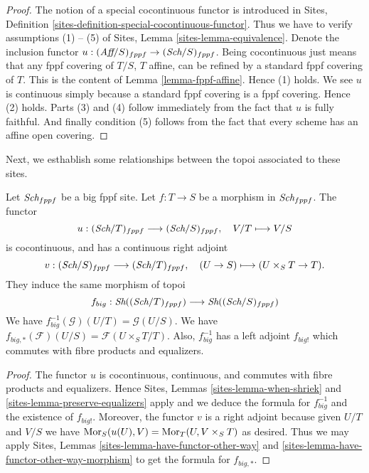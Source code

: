 \begin{proof}
The notion of a special cocontinuous functor is introduced in
Sites, Definition \ref{sites-definition-special-cocontinuous-functor}.
Thus we have to verify assumptions (1) -- (5) of
Sites, Lemma \ref{sites-lemma-equivalence}.
Denote the inclusion functor
$u : (\textit{Aff}/S)_{fppf} \to (\textit{Sch}/S)_{fppf}$.
Being cocontinuous just means that any fppf covering of
$T/S$, $T$ affine, can be refined by a standard fppf covering of $T$.
This is the content of
Lemma \ref{lemma-fppf-affine}.
Hence (1) holds. We see $u$ is continuous simply because a standard
fppf covering is a fppf covering. Hence (2) holds.
Parts (3) and (4) follow immediately from the fact that $u$ is
fully faithful. And finally condition (5) follows from the
fact that every scheme has an affine open covering.
\end{proof}

\noindent
Next, we esthablish some relationships between the topoi
associated to these sites.

\begin{lemma}
\label{lemma-morphism-big-fppf}
Let $\textit{Sch}_{fppf}$ be a big fppf site.
Let $f : T \to S$ be a morphism in $\textit{Sch}_{fppf}$.
The functor
$$
u : (\textit{Sch}/T)_{fppf} \longrightarrow (\textit{Sch}/S)_{fppf},
\quad
V/T \longmapsto V/S
$$
is cocontinuous, and has a continuous right adjoint
$$
v : (\textit{Sch}/S)_{fppf} \longrightarrow (\textit{Sch}/T)_{fppf},
\quad
(U \to S) \longmapsto (U \times_S T \to T).
$$
They induce the same morphism of topoi
$$
f_{big} :
\mathop{\textit{Sh}}\nolimits((\textit{Sch}/T)_{fppf})
\longrightarrow
\mathop{\textit{Sh}}\nolimits((\textit{Sch}/S)_{fppf})
$$
We have $f_{big}^{-1}(\mathcal{G})(U/T) = \mathcal{G}(U/S)$.
We have $f_{big, *}(\mathcal{F})(U/S) = \mathcal{F}(U \times_S T/T)$.
Also, $f_{big}^{-1}$ has a left adjoint $f_{big!}$ which commutes with
fibre products and equalizers.
\end{lemma}

\begin{proof}
The functor $u$ is cocontinuous, continuous, and commutes with fibre products
and equalizers. Hence
Sites, Lemmas \ref{sites-lemma-when-shriek} and
\ref{sites-lemma-preserve-equalizers}
apply and we deduce the formula
for $f_{big}^{-1}$ and the existence of $f_{big!}$. Moreover,
the functor $v$ is a right adjoint because given $U/T$ and $V/S$
we have $\mathop{\rm Mor}\nolimits_S(u(U), V) = \mathop{\rm Mor}\nolimits_T(U, V \times_S T)$
as desired. Thus we may apply
Sites, Lemmas \ref{sites-lemma-have-functor-other-way} and
\ref{sites-lemma-have-functor-other-way-morphism} to get the
formula for $f_{big, *}$.
\end{proof}


